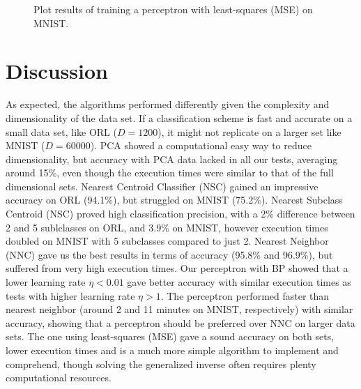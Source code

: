 \documentclass[journal]{IEEEtran}
\begin{document}
\begin{figure}[H]
	\centering
	\caption{Plot results of training a perceptron with least-squares (MSE) on MNIST.}
	\label{fig:mnistperceptronmse}
\end{figure}

\section{Discussion}

As expected, the algorithms performed differently given the complexity and dimensionality of the data set. If a classification scheme is fast and accurate on a small data set, like ORL ($D=1200$), it might not replicate on a larger set like MNIST ($D=60000$). PCA showed a computational easy way to reduce dimensionality, but accuracy with PCA data lacked in all our tests, averaging around 15\%, even though the execution times were similar to that of the full dimensional sets. Nearest Centroid Classifier (NSC) gained an impressive accuracy on ORL (94.1\%), but struggled on MNIST (75.2\%). Nearest Subclass Centroid (NSC) proved high classification precision, with a 2\% difference between 2 and 5 sublclasses on ORL, and 3.9\% on MNIST, however execution times doubled on MNIST with 5 subclasses compared to just 2. Nearest Neighbor (NNC) gave us the best results in terms of accuracy (95.8\% and 96.9\%), but suffered from very high execution times. Our perceptron with BP showed that a lower learning rate $\eta < 0.01$ gave better accuracy with similar execution times as tests with higher learning rate $\eta > 1$. The perceptron performed faster than nearest neighbor (around 2 and 11 minutes on MNIST, respectively) with similar accuracy, showing that a perceptron should be preferred over NNC on larger data sets. The one using least-squares (MSE) gave a sound accuracy on both sets, lower execution times and is a much more simple algorithm to implement and comprehend, though solving the generalized inverse often requires plenty computational resources.
\end{document}
